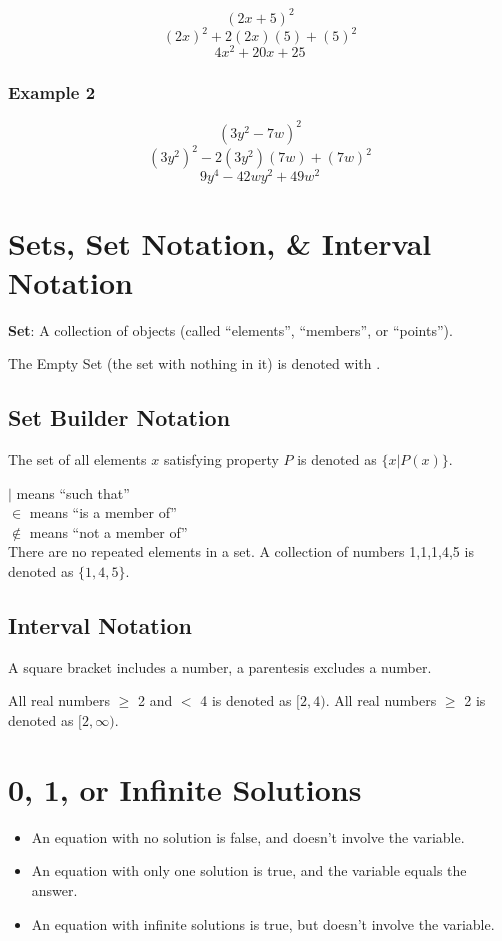 \documentclass{article}
\begin{document}
$$(2x + 5)^2$$
$$(2x)^2 + 2(2x)(5) + (5)^2$$
$$4x^2 + 20x + 25$$

\subsubsection{Example 2}
$$ (3y^2 - 7w)^2 $$
$$ (3y^2)^2 - 2(3y^2)(7w) + (7w)^2$$
$$ 9y^4 - 42wy^2 + 49w^2 $$ 

\section{Sets, Set Notation, \& Interval Notation}
\noindent \textbf{Set}: A collection of objects (called ``elements'', ``members'', or ``points'').

The Empty Set (the set with nothing in it) is denoted with \emptyset. 
\subsection{Set Builder Notation}
The set of all elements $x$ satisfying property $P$ is denoted as $\{x | P(x)\}$.

$|$ means ``such that'' \\ 
$\in$ means ``is a member of''\\
$\notin$ means ``not a member of''\\
There are no repeated elements in a set. A collection of numbers 1,1,1,4,5 is denoted as $\{1,4,5\}$.
\subsection{Interval Notation}
A square bracket includes a number, a parentesis excludes a number.

All real numbers $\geq$ 2 and $<$ 4 is denoted as $[2, 4)$.
All real numbers $\geq$ 2 is denoted as $[2,\infty)$.

\section{0, 1, or Infinite Solutions}

\begin{itemize}
\item An equation with no solution is false, and doesn't involve the variable.

\item An equation with only one solution is true, and the variable equals the answer.

\item An equation with infinite solutions is true, but doesn't involve the variable.
\end{itemize}
\end{document}
